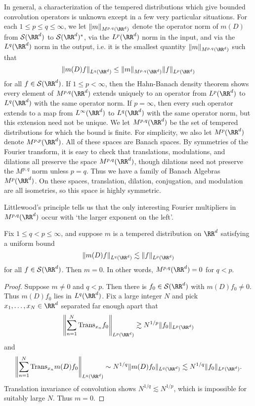 In general, a characterization of the tempered distributions which give bounded convolution operators is unknown except in a few very particular situations. For each $1 \leq p \leq q \leq \infty$, we let $\| m \|_{M^{p,q}(\RR^d)}$ denote the operator norm of $m(D)$ from $\mathcal{S}(\RR^d)$ to $\mathcal{S}(\RR^d)^*$, via the $L^p(\RR^d)$ norm in the input, and via the $L^q(\RR^d)$ norm in the output, i.e. it is the smallest quantity $\| m \|_{M^{p,q}(\RR^d)}$ such that
%
\[ \| m(D) f \|_{L^q(\RR^d)} \leq \| m \|_{M^{p,q}(\RR^d)} \| f \|_{L^p(\RR^d)} \]
%
for all $f \in \mathcal{S}(\RR^d)$. If $1 \leq p < \infty$, then the Hahn-Banach density theorem shows every element of $M^{p,q}(\RR^d)$ extends uniquely to an operator from $L^p(\RR^d)$ to $L^q(\RR^d)$ with the same operator norm. If $p = \infty$, then every such operator extends to a map from $L^\infty(\RR^d)$ to $L^q(\RR^d)$ with the same operator norm, but this extension need not be unique. We let $M^{p,q}(\RR^d)$ be the set of tempered distributions for which the bound is finite. For simplicity, we also let $M^p(\RR^d)$ denote $M^{p,p}(\RR^d)$. All of these spaces are Banach spaces. By symmetries of the Fourier transform, it is easy to check that translations, modulations, and dilations all preserve the space $M^{p,q}(\RR^d)$, though dilations need not preserve the $M^{p,q}$ norm unless $p = q$. Thus we have a family of Banach Algebras $M^p(\RR^d)$. On these spaces, translation, dilation, conjugation, and modulation are all isometries, so this space is highly symmetric.

Littlewood's principle tells us that the only interesting Fourier multipliers in $M^{p,q}(\RR^d)$ occur with `the larger exponent on the left'.

\begin{theorem}
  Fix $1 \leq q < p \leq \infty$, and suppose $m$ is a tempered distribution on $\RR^d$ satisfying a uniform bound
  \[ \| m(D) f \|_{L^q(\RR^d)} \lesssim \| f \|_{L^p(\RR^d)} \]
  for all $f \in \mathcal{S}(\RR^d)$. Then $m = 0$. In other words, $M^{p,q}(\RR^d) = 0$ for $q < p$.
\end{theorem}
\begin{proof}
  Suppose $m \neq 0$ and $q < p$. Then there is $f_0 \in \mathcal{S}(\RR^d)$ with $m(D) f_0 \neq 0$. Thus $m(D) f_0$ lies in $L^q(\RR^d)$. Fix a large integer $N$ and pick $x_1,\dots,x_N \in \RR^d$ separated far enough apart that
  \[ \left\| \sum_{n = 1}^N \text{Trans}_{x_n} f_0 \right\|_{L^p(\RR^d)} \gtrsim N^{1/p} \| f_0 \|_{L^p(\RR^d)} \]
  and
  \[ \left\| \sum_{n = 1}^N \text{Trans}_{x_n} m(D) f_0 \right\|_{L^q(\RR^d)} \sim N^{1/q} \| m(D) f_0 \|_{L^q(\RR^d)} \lesssim N^{1/q} \| f_0 \|_{L^p(\RR^d)}. \]
  Translation invariance of convolution shows $N^{1/q} \lesssim N^{1/p}$, which is impossible for suitably large $N$. Thus $m = 0$.
\end{proof}

